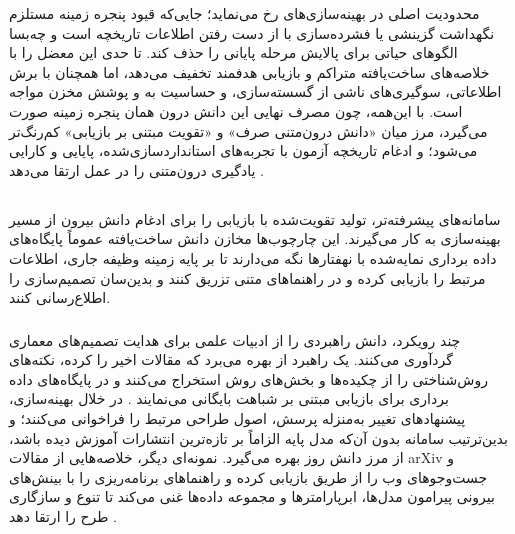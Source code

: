 محدودیت اصلی در بهینه‌سازی‌های  رخ می‌نماید؛ جایی‌که قیود پنجره زمینه مستلزم نگهداشت گزینشی یا فشرده‌سازی با از دست رفتن اطلاعات تاریخچه است و چه‌بسا الگوهای حیاتی برای پالایش مرحله پایانی را حذف کند.  تا حدی این معضل را با خلاصه‌های ساخت‌یافته متراکم و بازیابی هدفمند تخفیف می‌دهد، اما همچنان با برش اطلاعاتی، سوگیری‌های ناشی از گسسته‌سازی، و حساسیت به  و پوشش مخزن مواجه است. با این‌همه، چون مصرف نهایی این دانش درون همان پنجره زمینه صورت می‌گیرد، مرز میان «دانش درون‌متنی صرف» و «تقویت مبتنی بر بازیابی» کم‌رنگ‌تر می‌شود؛ و ادغام تاریخچه آزمون با تجربه‌های استانداردسازی‌شده، پایایی و کارایی یادگیری درون‌متنی را در عمل ارتقا می‌دهد \cite{zhang2023usingLLMforHPO, zheng2023GENIUS, chen2023Evoprompting, liu2024LLAMBO, zhang-etal-2024-MLCopilot}.

\subsection[دانش بیرونی: بازیابی از ادبیات و مخازن]{}

سامانه‌های پیشرفته‌تر، تولید تقویت‌شده با بازیابی را برای ادغام دانش بیرون از مسیر بهینه‌سازی به کار می‌گیرند. این چارچوب‌ها مخازن دانش ساخت‌یافته عموماً پایگاه‌های داده برداری نمایه‌شده با نهفتارها نگه می‌دارند تا بر پایه زمینه وظیفه جاری، اطلاعات مرتبط را بازیابی کرده و در راهنماهای متنی تزریق کنند و بدین‌سان تصمیم‌سازی را اطلاع‌رسانی کنند.

\subsubsection{\protect{}}

چند رویکرد، دانش راهبردی را از ادبیات علمی برای هدایت تصمیم‌های معماری گردآوری می‌کنند. یک راهبرد از  بهره می‌برد که مقالات اخیر را  کرده، نکته‌های روش‌شناختی را از چکیده‌ها و بخش‌های روش استخراج می‌کنند و در پایگاه‌های داده برداری برای بازیابی مبتنی بر شباهت بایگانی می‌نمایند \cite{Yang2025NADER}. در خلال بهینه‌سازی، پیشنهادهای تغییر به‌منزله پرسش، اصول طراحی مرتبط را فراخوانی می‌کنند؛ و بدین‌ترتیب سامانه بدون آن‌که مدل پایه الزاماً بر تازه‌ترین انتشارات آموزش دیده باشد، از مرز دانش روز بهره می‌گیرد. نمونه‌ای دیگر، خلاصه‌هایی از مقالات arXiv و جست‌وجوهای وب را از طریق  بازیابی کرده و راهنماهای برنامه‌ریزی را با بینش‌های بیرونی پیرامون مدل‌ها، ابرپارامترها و مجموعه داده‌ها غنی می‌کند تا تنوع و سازگاری طرح را ارتقا دهد \cite{trirat2025automlagent}.

